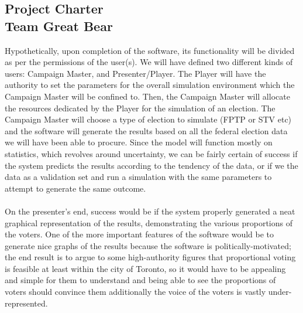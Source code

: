 \documentclass{report}
\begin{document}
\begin{center}
\section*{Project Charter\\Team Great Bear\\}
\end{center}
Hypothetically, upon completion of the software, its functionality will be divided as per the permissions of the user(s). We will have defined two different kinds of users: Campaign Master, and Presenter/Player. The Player will have the authority to set the parameters for the overall simulation environment which the Campaign Master will be confined to. Then, the Campaign Master will allocate the resources dedicated by the Player for the simulation of an election. The Campaign Master will choose a type of election to simulate (FPTP or STV etc) and the software will generate the results based on all the federal election data we will have been able to procure. Since the model will function mostly on statistics, which revolves around uncertainty, we can be fairly certain of success if the system predicts the results according to the tendency of the data, or if we the data as a validation set and run a simulation with the same parameters to attempt to generate the same outcome.\\\\
On the presenter's end, success would be if the system properly generated a neat graphical representation of the results, demonstrating the various proportions of the voters. One of the more important features of the software would be to generate nice graphs of the results because the software is politically-motivated; the end result is to argue to some high-authority figures that proportional voting is feasible at least within the city of Toronto, so it would have to be appealing and simple for them to understand and being able to see the proportions of voters should convince them additionally the voice of the voters is vastly under-represented. 
\end{document}
